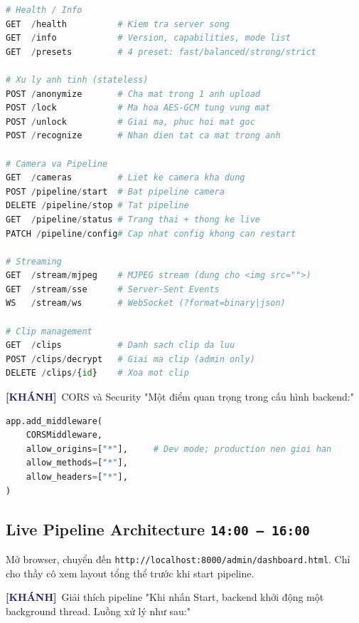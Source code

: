 \documentclass[12pt, a4paper]{article}
\newcommand{\timing}[1]{%
  \hfill\colorbox{NavyBlue!20}{\texttt{\small #1}}%
}
\newcommand{\khanh}{\textcolor{MidnightBlue}{\textbf{[KHÁNH]}}}
\begin{document}
\begin{lstlisting}[language=Python, caption={src/app\_api.py --- Endpoint catalog}]
# Health / Info
GET  /health          # Kiem tra server song
GET  /info            # Version, capabilities, mode list
GET  /presets         # 4 preset: fast/balanced/strong/strict

# Xu ly anh tinh (stateless)
POST /anonymize       # Cha mat trong 1 anh upload
POST /lock            # Ma hoa AES-GCM tung vung mat
POST /unlock          # Giai ma, phuc hoi mat goc
POST /recognize       # Nhan dien tat ca mat trong anh

# Camera va Pipeline
GET  /cameras         # Liet ke camera kha dung
POST /pipeline/start  # Bat pipeline camera
DELETE /pipeline/stop # Tat pipeline
GET  /pipeline/status # Trang thai + thong ke live
PATCH /pipeline/config# Cap nhat config khong can restart

# Streaming
GET  /stream/mjpeg    # MJPEG stream (dung cho <img src="">)
GET  /stream/sse      # Server-Sent Events
WS   /stream/ws       # WebSocket (?format=binary|json)

# Clip management
GET  /clips           # Danh sach clip da luu
POST /clips/decrypt   # Giai ma clip (admin only)
DELETE /clips/{id}    # Xoa mot clip
\end{lstlisting}

\begin{dialog}{\khanh\ CORS và Security}
"Một điểm quan trọng trong cấu hình backend:"
\end{dialog}

\begin{lstlisting}[language=Python, caption={src/app\_api.py --- CORS middleware}]
app.add_middleware(
    CORSMiddleware,
    allow_origins=["*"],     # Dev mode; production nen gioi han
    allow_methods=["*"],
    allow_headers=["*"],
)
\end{lstlisting}

\subsection{Live Pipeline Architecture \timing{14:00 – 16:00}}

\begin{action}
Mở browser, chuyển đến \texttt{http://localhost:8000/admin/dashboard.html}.
Chỉ cho thầy cô xem layout tổng thể trước khi start pipeline.
\end{action}

\begin{dialog}{\khanh\ Giải thích pipeline}
"Khi nhấn Start, backend khởi động một background thread.
Luồng xử lý như sau:"
\end{dialog}
\end{document}
